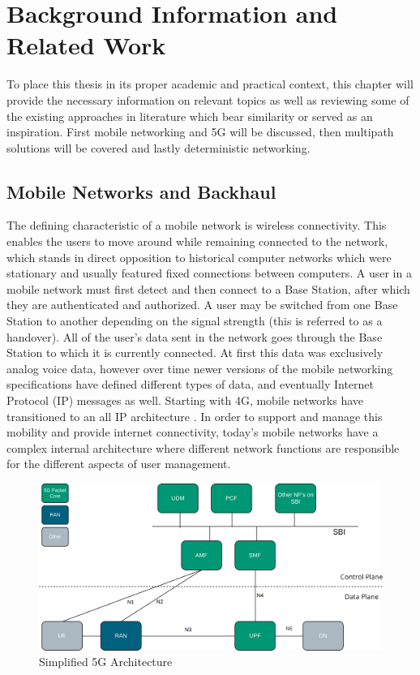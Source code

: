 
\cleardoublepage
\chapter{Background Information and Related Work}
\label{cha:background}

To place this thesis in its proper academic and practical context, this chapter will provide the necessary information on relevant topics as well as reviewing some of the existing approaches in literature which bear similarity or served as an inspiration. First mobile networking and 5G will be discussed, then multipath solutions will be covered and lastly deterministic networking.

\section{Mobile Networks and Backhaul}

The defining characteristic of a mobile network is wireless connectivity. This enables the users to move around while remaining connected to the network, which stands in direct opposition to historical computer networks which were stationary and usually featured fixed connections between computers. A user in a mobile network must first detect and then connect to a Base Station, after which they are authenticated and authorized. A user may be switched from one Base Station to another depending on the signal strength (this is referred to as a handover). All of the user's data sent in the network goes through the Base Station to which it is currently connected. At first this data was exclusively analog voice data, however over time newer versions of the mobile networking specifications have defined different types of data, and eventually Internet Protocol (IP) messages as well. Starting with 4G, mobile networks have transitioned to an all IP architecture \cite{3gpp.36.300}. In order to support and manage this mobility and provide internet connectivity, today's mobile networks have a complex internal architecture where different network functions are responsible for the different aspects of user management.

\begin{figure}[ht]
    \centering
	\includegraphics[width=\linewidth]{fig/core.png}
	\caption{Simplified 5G Architecture}
	\label{fig:core}
\end{figure} 

